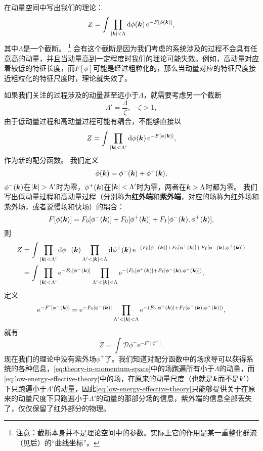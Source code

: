 \documentclass[hyperref, UTF8, a4paper]{ctexart}
\newcommand*{\ee}{\mathrm{e}}
\newcommand*{\fd}[1]{\mathcal{D}{#1}}
\begin{document}
在动量空间中写出我们的理论：
\begin{equation}
    Z = \int \prod_{\abs{\vb*{k}} < \Lambda} \dd{\phi(\vb*{k})} \ee^{ - F[\phi(\vb*{k})]},
    \label{eq:theory-in-momentum-space}
\end{equation}
其中$\Lambda$是一个截断。%
\footnote{注意：截断本身并不是理论空间中的参数。实际上它的作用是某一重整化群流（见后）的“曲线坐标”。}%
会有这个截断是因为我们考虑的系统涉及的过程不会具有任意高的动量，并且当动量高到一定程度时我们的理论可能失效。例如，高动量对应着较低的特征长度，而$F[\phi]$可能是经过粗粒化的，那么当动量对应的特征尺度接近粗粒化的特征尺度时，理论就失效了。

如果我们关注的过程涉及的动量甚至远小于$\Lambda$，就需要考虑另一个截断
\[
    \Lambda' = \frac{\Lambda}{\zeta}, \quad \zeta > 1,
\]
由于低动量过程和高动量过程可能有耦合，不能够直接以
\[
    Z = \int \prod_{\abs{\vb*{k}} < \Lambda' } \dd{\phi(\vb*{k})} \ee^{ - F[\phi(\vb*{k})]},
\]
作为新的配分函数。
我们定义
\[
    \phi(\vb*{k}) = \phi^-(\vb*{k}) + \phi^+(\vb*{k}),
\]
$\phi^-(\vb*{k})$在$\abs{\vb*{k}} > \Lambda'$时为零，$\phi^+(\vb*{k})$在$\abs{\vb*{k}} < \Lambda'$时为零，两者在$\vb*{k} > \Lambda$时都为零。
我们写出低动量过程和高动量过程（分别称为\textbf{红外端}和\textbf{紫外端}，对应的场称为红外场和紫外场，或者说慢场和快场）的耦合：
\[
    F[\phi(\vb*{k})] = F_0 [\phi^-(\vb*{k})] + F_0 [\phi^+(\vb*{k})] + F_I [\phi^-(\vb*{k}) , \phi^+ (\vb*{k})],
\]
则
\[
    \begin{aligned}
        Z &= \int \prod_{\abs{\vb*{k}} < \Lambda'} \dd{\phi^{-}(\vb*{k})} \prod_{\Lambda' < \abs{\vb*{k}} < \Lambda} \dd{\phi^+ (\vb*{k})} \ee^{- (F_0 [\phi^-(\vb*{k})] + F_0 [\phi^+(\vb*{k})] + F_I [\phi^-(\vb*{k}) , \phi^+ (\vb*{k})])} \\
        &= \int \prod_{\abs{\vb*{k}} < \Lambda'} \ee^{- F_0 [\phi^-(\vb*{k})]} \prod_{\Lambda' < \abs{\vb*{k}} < \Lambda} \ee^{- (F_0 [\phi^+(\vb*{k})] + F_I [\phi^-(\vb*{k}) , \phi^+ (\vb*{k})])},
    \end{aligned}
\]
定义
\[
    \ee^{-F'[\phi^-(\vb*{k})]} = \ee^{- F_0 [\phi^-(\vb*{k})]} \prod_{\Lambda' < \abs{\vb*{k}} < \Lambda} \ee^{- (F_0 [\phi^+(\vb*{k})] + F_I [\phi^-(\vb*{k}) , \phi^+ (\vb*{k})])},
\]
就有
\begin{equation}
    Z = \int \fd{\phi^-} \ee^{-F'[\phi^-]}.
    \label{eq:low-energy-effective-theory}
\end{equation}
现在我们的理论中没有紫外场$\phi^+$了。我们知道对配分函数中的场求导可以获得系统的各种信息，\eqref{eq:theory-in-momentum-space}中的场跑遍所有小于$\Lambda$的动量，而\eqref{eq:low-energy-effective-theory}中的场，在原来的动量尺度（也就是$\vb*{k}$而不是$\vb*{k}'$）下只跑遍小于$\Lambda'$的动量，因此\eqref{eq:low-energy-effective-theory}只能够提供关于在原来的动量尺度下只跑遍小于$\Lambda'$的动量的那部分场的信息，紫外端的信息全部丢失了，仅仅保留了红外部分的物理。
\end{document}

